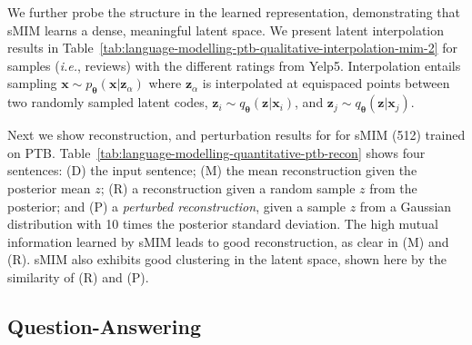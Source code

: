 \documentclass{article}
\newcommand{\bs}{\boldsymbol}
\newcommand{\ie}{{\em i.e.}}
\newcommand{\x}{{\bs{x}}}
\newcommand{\z}{{\bs z}}
\newcommand{\params}{{\bs \theta}}
\newcommand{\pdec}{p}
\newcommand{\penc}{q}
\newcommand{\Mdec}{\pdec_{\params}}
\newcommand{\Menc}{\penc_{\params}}
\begin{document}
We further probe the structure in the learned representation, demonstrating that
sMIM learns a dense, meaningful latent space. We present latent interpolation results in
Table\ \ref{tab:language-modelling-ptb-qualitative-interpolation-mim-2}
for samples (\ie, reviews) with the different ratings from Yelp5. 
Interpolation entails sampling $\x \sim \Mdec(\x| \z_\alpha)$ where $\z_\alpha$ is interpolated at equispaced points  
between two randomly sampled latent codes, $\z_i \sim \Menc(\z|\x_i)$, and $\z_j \sim \Menc(\z|\x_j)$.

Next we show reconstruction, and perturbation
results for for sMIM (512) trained on PTB. 
Table\ \ref{tab:language-modelling-quantitative-ptb-recon} shows four sentences:
(D) the input sentence;
(M) the mean reconstruction given the posterior mean $z$;
(R) a reconstruction given a random sample $z$ from the posterior;
and 
(P) a {\em perturbed reconstruction}, given a sample $z$ from a Gaussian
distribution with 10 times the posterior standard deviation.
The high mutual information learned by sMIM leads to good reconstruction, as clear in (M) and (R).
sMIM also exhibits good clustering in the latent space, shown here by the similarity of (R) and (P).


\subsection{Question-Answering} 
\label{sec:nlp-question-answering-yahoo}
\end{document}
